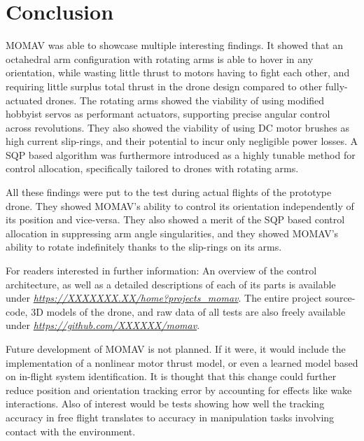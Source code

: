 \documentclass[conference]{IEEEtran}
\newcommand{\urlinfo}{https://XXXXXXX.XX/home?projects_momav}
\newcommand{\urlgit}{https://github.com/XXXXXX/momav}
\newcommand{\urlinfo}{https://marcoruggia.ch/home?projects_momav}
\newcommand{\urlgit}{https://github.com/mruggia/momav}
\begin{document}
\section{Conclusion}
MOMAV was able to showcase multiple interesting findings. It showed that an octahedral arm configuration with rotating arms is able to hover in any orientation, while wasting little thrust to motors having to fight each other, and requiring little surplus total thrust in the drone design compared to other fully-actuated drones. The rotating arms showed the viability of using modified hobbyist servos as performant actuators, supporting precise angular control across revolutions. They also showed the viability of using DC motor brushes as high current slip-rings, and their potential to incur only negligible power losses. A SQP based algorithm was furthermore introduced as a highly tunable method for control allocation, specifically tailored to drones with rotating arms.
\par
All these findings were put to the test during actual flights of the prototype drone. They showed MOMAV's ability to control its orientation independently of its position and vice-versa.  They also showed a merit of the SQP based control allocation in suppressing arm angle singularities, and they showed MOMAV's ability to rotate indefinitely thanks to the slip-rings on its arms.
\par
For readers interested in further information: An overview of the control architecture, as well as a detailed descriptions of each of its parts is available under \textit{\url{\urlinfo}}. The entire project source-code, 3D models of the drone, and raw data of all tests are also freely available under \textit{\url{\urlgit}}.
\par
Future development of MOMAV is not planned. If it were, it would include the implementation of a nonlinear motor thrust model, or even a learned model based on in-flight system identification. It is thought that this change could further reduce position and orientation tracking error by accounting for effects like wake interactions. Also of interest would be tests showing how well the tracking accuracy in free flight translates to accuracy in manipulation tasks involving contact with the environment.


\vspace{20pt}
\appendix
\vspace{8pt}
\end{document}
